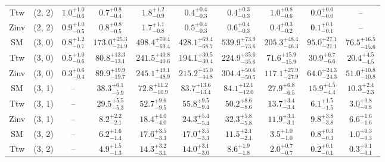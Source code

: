 \begin{table}[h!]
{\begin{tabular}{cccccccccc}
	Ttw & (2, 2) & $1.0^{+ 1.0 }_{- 0.6 }$ & $0.7^{+ 0.8 }_{- 0.4 }$ & $1.8^{+ 1.2 }_{- 0.9 }$ & $0.4^{+ 0.4 }_{- 0.3 }$ & $0.4^{+ 0.3 }_{- 0.3 }$ & $1.0^{+ 0.8 }_{- 0.6 }$ & $0.0^{+ 0.0 }_{- 0.0 }$ & -- \\[0.5ex] 
	Zinv & (2, 2) & $0.9^{+ 1.0 }_{- 0.5 }$ & $0.8^{+ 0.8 }_{- 0.5 }$ & $1.7^{+ 1.1 }_{- 0.8 }$ & $0.5^{+ 0.4 }_{- 0.3 }$ & $0.6^{+ 0.4 }_{- 0.3 }$ & $0.4^{+ 0.3 }_{- 0.2 }$ & $0.1^{+ 0.1 }_{- 0.1 }$ & -- \\[0.5ex] 
	SM & (3, 0) & $0.8^{+ 1.2 }_{- 0.7 }$ & $173.0^{+ 25.3 }_{- 24.9 }$ & $498.4^{+ 70.4 }_{- 69.4 }$ & $428.1^{+ 69.4 }_{- 68.7 }$ & $539.9^{+ 73.9 }_{- 73.6 }$ & $205.3^{+ 48.4 }_{- 46.3 }$ & $95.0^{+ 27.1 }_{- 27.1 }$ & $76.5^{+ 16.5 }_{- 15.6 }$ \\[0.5ex] 
	Ttw & (3, 0) & $0.5^{+ 1.0 }_{- 0.6 }$ & $80.8^{+ 13.3 }_{- 13.1 }$ & $241.5^{+ 40.8 }_{- 40.6 }$ & $194.1^{+ 30.5 }_{- 30.4 }$ & $224.9^{+ 35.6 }_{- 35.6 }$ & $71.6^{+ 15.9 }_{- 15.9 }$ & $30.9^{+ 6.7 }_{- 6.6 }$ & $20.4^{+ 4.5 }_{- 4.5 }$ \\[0.5ex] 
	Zinv & (3, 0) & $0.3^{+ 0.6 }_{- 0.4 }$ & $89.9^{+ 19.9 }_{- 19.7 }$ & $245.1^{+ 49.1 }_{- 48.9 }$ & $215.2^{+ 45.0 }_{- 44.8 }$ & $304.4^{+ 50.6 }_{- 50.5 }$ & $117.1^{+ 27.9 }_{- 27.9 }$ & $64.0^{+ 24.3 }_{- 24.3 }$ & $51.0^{+ 10.8 }_{- 10.8 }$ \\[0.5ex] 
	SM & (3, 1) & -- & $38.3^{+ 6.1 }_{- 5.9 }$ & $72.8^{+ 11.2 }_{- 10.9 }$ & $83.7^{+ 13.6 }_{- 13.4 }$ & $84.1^{+ 12.1 }_{- 12.0 }$ & $27.9^{+ 6.8 }_{- 6.5 }$ & $15.9^{+ 4.5 }_{- 4.4 }$ & $10.3^{+ 2.4 }_{- 2.3 }$ \\[0.5ex] 
	Ttw & (3, 1) & -- & $29.5^{+ 5.5 }_{- 5.3 }$ & $52.7^{+ 9.6 }_{- 9.5 }$ & $55.8^{+ 9.5 }_{- 9.4 }$ & $50.2^{+ 8.6 }_{- 8.6 }$ & $13.7^{+ 3.4 }_{- 3.4 }$ & $6.1^{+ 1.5 }_{- 1.5 }$ & $3.0^{+ 0.8 }_{- 0.8 }$ \\[0.5ex] 
	Zinv & (3, 1) & -- & $8.2^{+ 2.2 }_{- 2.1 }$ & $18.4^{+ 4.0 }_{- 4.0 }$ & $24.3^{+ 5.4 }_{- 5.4 }$ & $32.3^{+ 5.8 }_{- 5.8 }$ & $11.9^{+ 3.1 }_{- 3.1 }$ & $9.8^{+ 3.8 }_{- 3.8 }$ & $6.6^{+ 1.6 }_{- 1.6 }$ \\[0.5ex] 
	SM & (3, 2) & -- & $6.2^{+ 1.6 }_{- 1.4 }$ & $17.6^{+ 3.5 }_{- 3.3 }$ & $17.0^{+ 3.5 }_{- 3.3 }$ & $11.5^{+ 2.1 }_{- 2.1 }$ & $3.5^{+ 1.0 }_{- 1.0 }$ & $0.8^{+ 0.3 }_{- 0.3 }$ & $1.0^{+ 0.3 }_{- 0.3 }$ \\[0.5ex] 
	Ttw & (3, 2) & -- & $4.9^{+ 1.5 }_{- 1.3 }$ & $14.3^{+ 3.2 }_{- 3.1 }$ & $14.0^{+ 3.1 }_{- 3.0 }$ & $8.6^{+ 1.9 }_{- 1.8 }$ & $2.0^{+ 0.7 }_{- 0.7 }$ & $0.2^{+ 0.1 }_{- 0.1 }$ & $0.3^{+ 0.1 }_{- 0.1 }$ \\[0.5ex] 

\end{tabular}}
\end{table}
